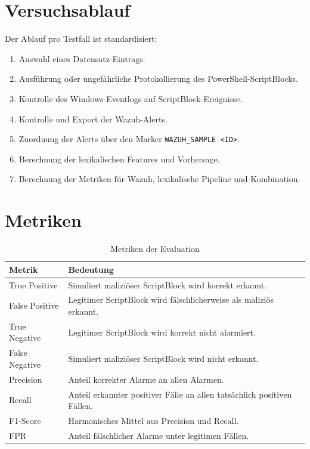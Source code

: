 \documentclass[12pt,a4paper,oneside,parskip=half]{scrreprt}
\begin{document}
\section{Versuchsablauf}
Der Ablauf pro Testfall ist standardisiert:
\begin{enumerate}
    \item Auswahl eines Datensatz-Eintrags.
    \item Ausführung oder ungefährliche Protokollierung des PowerShell-ScriptBlocks.
    \item Kontrolle des Windows-Eventlogs auf ScriptBlock-Ereignisse.
    \item Kontrolle und Export der Wazuh-Alerts.
    \item Zuordnung der Alerts über den Marker \texttt{WAZUH\_SAMPLE <ID>}.
    \item Berechnung der lexikalischen Features und Vorhersage.
    \item Berechnung der Metriken für Wazuh, lexikalische Pipeline und Kombination.
\end{enumerate}

\section{Metriken}
\begin{table}[H]
\centering
\caption{Metriken der Evaluation}
\begin{tabularx}{\textwidth}{|L{2.6cm}|Y|}
\hline
\textbf{Metrik} & \textbf{Bedeutung}\\
\hline
True Positive & Simuliert maliziöser ScriptBlock wird korrekt erkannt.\\
\hline
False Positive & Legitimer ScriptBlock wird fälschlicherweise als maliziös erkannt.\\
\hline
True Negative & Legitimer ScriptBlock wird korrekt nicht alarmiert.\\
\hline
False Negative & Simuliert maliziöser ScriptBlock wird nicht erkannt.\\
\hline
Precision & Anteil korrekter Alarme an allen Alarmen.\\
\hline
Recall & Anteil erkannter positiver Fälle an allen tatsächlich positiven Fällen.\\
\hline
F1-Score & Harmonisches Mittel aus Precision und Recall.\\
\hline
FPR & Anteil fälschlicher Alarme unter legitimen Fällen.\\
\hline
\end{tabularx}
\end{table}
\end{document}

